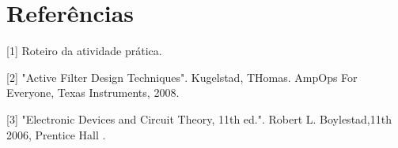 \newpage
\section{Referências}

[1] Roteiro da atividade prática.
\vspace{0.5cm}

[2] "Active Filter Design Techniques". Kugelstad, THomas. AmpOps For Everyone, Texas Instruments, 2008.
\vspace{0.5cm}

[3] "Electronic Devices and Circuit Theory, 11th ed.".  Robert L. Boylestad,11th 2006, Prentice Hall .